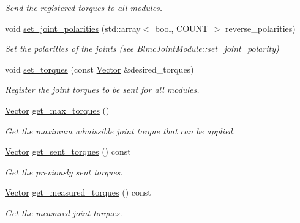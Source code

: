 \begin{DoxyCompactItemize}
\begin{DoxyCompactList}\small\item\em Send the registered torques to all modules. \end{DoxyCompactList}\item 
void \hyperlink{classblmc__robots_1_1BlmcJointModules_a97f538c52a1c00846497417333f93230}{set\+\_\+joint\+\_\+polarities} (std\+::array$<$ bool, C\+O\+U\+NT $>$ reverse\+\_\+polarities)
\begin{DoxyCompactList}\small\item\em Set the polarities of the joints (see \hyperlink{classblmc__robots_1_1BlmcJointModule_a137da65771a8628db4692e3bfc924f07}{Blmc\+Joint\+Module\+::set\+\_\+joint\+\_\+polarity}) \end{DoxyCompactList}\item 
void \hyperlink{classblmc__robots_1_1BlmcJointModules_ac7dba81727847238fc4c42b7dca6a0ea}{set\+\_\+torques} (const \hyperlink{classblmc__robots_1_1BlmcJointModules_abaff382c6fd4b494ec0c17498d94919e}{Vector} \&desired\+\_\+torques)
\begin{DoxyCompactList}\small\item\em Register the joint torques to be sent for all modules. \end{DoxyCompactList}\item 
\hyperlink{classblmc__robots_1_1BlmcJointModules_abaff382c6fd4b494ec0c17498d94919e}{Vector} \hyperlink{classblmc__robots_1_1BlmcJointModules_a6cc2989e6132988557ebe03e69658f50}{get\+\_\+max\+\_\+torques} ()
\begin{DoxyCompactList}\small\item\em Get the maximum admissible joint torque that can be applied. \end{DoxyCompactList}\item 
\hyperlink{classblmc__robots_1_1BlmcJointModules_abaff382c6fd4b494ec0c17498d94919e}{Vector} \hyperlink{classblmc__robots_1_1BlmcJointModules_a9c71bc7db0ff4cd08bc2686a244caa65}{get\+\_\+sent\+\_\+torques} () const 
\begin{DoxyCompactList}\small\item\em Get the previously sent torques. \end{DoxyCompactList}\item 
\hyperlink{classblmc__robots_1_1BlmcJointModules_abaff382c6fd4b494ec0c17498d94919e}{Vector} \hyperlink{classblmc__robots_1_1BlmcJointModules_aeefc9487da9aafde41da790968a8165e}{get\+\_\+measured\+\_\+torques} () const 
\begin{DoxyCompactList}\small\item\em Get the measured joint torques. \end{DoxyCompactList}\item 

\end{DoxyCompactItemize}
